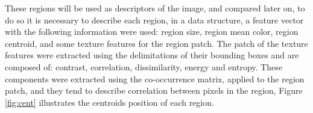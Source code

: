\documentclass[12pt,a4paper]{article}
\begin{document}
These regions will be used as descriptors of the image, and compared later on, to do so it is necessary to describe each region, in a data structure,  a feature vector with the following information were used: region size, region mean color, region centroid, and some texture features for the region patch. The patch of the texture features were extracted using the delimitations of their bounding boxes and are composed of: contrast, correlation, dissimilarity, energy and entropy. These components were extracted using the co-occurrence matrix, applied to the region patch, and they tend to describe correlation between pixels in the region, Figure \ref{fig:cent} illustrates the centroids position of each region. \\

\begin{figure}[!h]
	\centering
	\quad
\end{figure}
\end{document}
